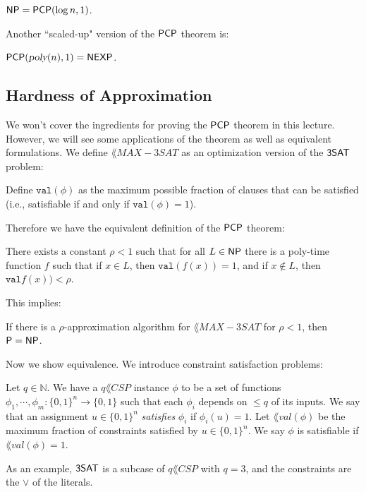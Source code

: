 \begin{theorem}
\label{thm:1_pcp}
${\mathsf{NP}} = {\mathsf{PCP}}(\log n, 1)$.
\end{theorem}

Another ``scaled-up" version of the ${\mathsf{PCP}}$ theorem is:
\begin{theorem}
${\mathsf{PCP}}({\textsl{poly}}(n), 1) = {\mathsf{NEXP}}$.
\end{theorem}

\subsection{Hardness of Approximation}
\newcommand{\MAXThreeSAT}{\lang{MAX-3SAT}}
We won't cover the ingredients for proving the ${\mathsf{PCP}}$ theorem in this lecture. However, we will see some applications of the theorem as well as equivalent formulations. We define $\MAXThreeSAT$ as an optimization version of the ${\mathsf{3SAT}}$ problem:

\begin{definition}
Define $\texttt{val}(\phi)$ as the maximum possible fraction of clauses that can be satisfied (i.e., satisfiable if and only if $\texttt{val}(\phi) = 1$).
\end{definition}

Therefore we have the equivalent definition of the ${\mathsf{PCP}}$ theorem:
\begin{theorem}
\label{thm:2_pcp}
There exists a constant $\rho < 1$ such that for all $L \in {\ensuremath{\mathsf{NP}}}$ there is a poly-time function $f$ such that if $x \in L$, then $\texttt{val}(f(x)) = 1$, and if $x \notin L$, then $\texttt{val}f(x)) < \rho$.
\end{theorem}

This implies:
\begin{corollary}
If there is a $\rho$-approximation algorithm for $\MAXThreeSAT$ for $\rho < 1$, then ${\mathsf{P}} = {\mathsf{NP}}$.
\end{corollary}

Now we show equivalence. We introduce constraint satisfaction problems:
\begin{definition}
Let $q \in \mathbb{N}$. We have a $q\lang{CSP}$ instance $\phi$ to be a set of functions $\phi_1, \cdots, \phi_m \colon \{0, 1\}^n \rightarrow \{0, 1\}$ such that each $\phi_i$ depends on $\le q$ of its inputs. We say that an assignment $u \in \{0, 1\}^n$ \emph{satisfies} $\phi_i$ if $\phi_i(u) = 1$. Let $\lang{val}(\phi)$ be the maximum fraction of constraints satisfied by $u \in \{0, 1\}^n$. We say $\phi$ is satisfiable if $\lang{val}(\phi) = 1$. 
\end{definition}
As an example, ${\mathsf{3SAT}}$ is a subcase of $q\lang{CSP}$ with $q = 3$, and the constraints are the $\vee$ of the literals. 

